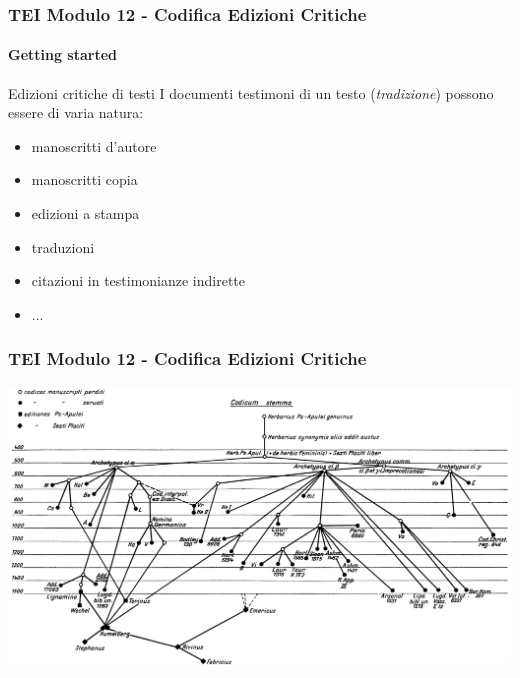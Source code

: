 \begin{frame}
    \frametitle{TEI Modulo 12 - Codifica Edizioni Critiche}
    \framesubtitle{Getting started}
    \addtocounter{nframe}{1}

    


    \begin{block}{Edizioni critiche di testi}
        I documenti testimoni di un testo (\textit{tradizione}) possono essere di varia natura:
        \begin{itemize}
            \item manoscritti d'autore
            \item manoscritti copia
            \item edizioni a stampa
            \item traduzioni
            \item citazioni in testimonianze indirette
            \item ...
        \end{itemize}
    \end{block}

\end{frame}

\begin{frame}
    \frametitle{TEI Modulo 12 - Codifica Edizioni Critiche}
    \addtocounter{nframe}{1}
    
    \begin{center}
        \includegraphics[width=.95\textwidth]{imgs/image.png}
    \end{center}

\end{frame}

